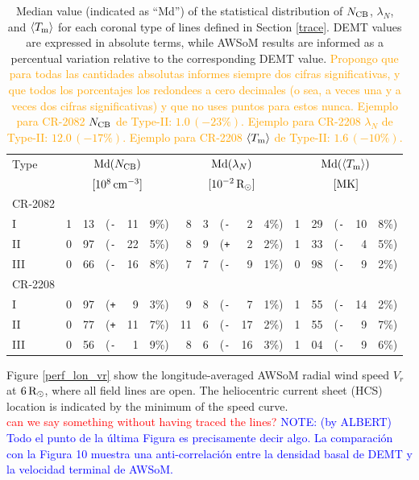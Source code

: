 \documentclass[namedreferences]{solarphysics}
\newcommand{\mrsun}{{\rm R_\odot}}
\newcommand{\med}{{\rm Md}}
\newcommand{\avgTe}{\left<\Tm\right>}
\newcommand{\MK}{{\rm MK}}
\newcommand{\lN}{\lambda_N}
\newcommand{\NCB}{N_{\rm CB}}
\newcommand{\Tm}{T_{\rm m}}
\newcommand{\aTm}{\left<\Tm\right>}
\newcommand{\Pl}{\texttt{+}}
\newcommand{\Mi}{\texttt{-}}
\def\diego#1{\textcolor{red}{#1}}
\def\albert#1{\textcolor{orange}{#1}}
\def\notebyalbert#1{\textcolor{blue}{NOTE: #1}}
\begin{document}
\begin{article}
\begin{table}
\begin{tabular}{l r@{.}l@{\hskip 0.05in} r@{\hskip 0.01in} r@{.}l  r@{.}l@{\hskip 0.05in} r@{\hskip 0.01in} r@{.}l r@{.}l@{\hskip 0.05in} r@{\hskip 0.01in} r@{.}l }
\hline
Type    & \multicolumn{5}{c}{$\med(\NCB)$}             & \multicolumn{5}{c}{$\med(\lN)$} & \multicolumn{5}{c}{$\med(\avgTe)$} \\
       & \multicolumn{5}{c}{$[10^8\,{\rm cm}^{-3}]$}  & \multicolumn{5}{c}{$[{\rm 10}^{-2}\,\mrsun]$} & \multicolumn{5}{c}{$[\MK]$} \\
\hline
CR-2082\\
I  & 1&13 &(\Mi&11&9\%)  &   8&3 &(\Mi&~2&4\%) &   1&29 &(\Mi&10&8\%) \\
II  & 0&97 &(\Mi&22&5\%)  &   8&9 &(\Pl&~2&2\%) &   1&33 &(\Mi&~4&5\%) \\
III  & 0&66 &(\Mi&16&8\%)  &   7&7 &(\Mi&~9&1\%) &   0&98 &(\Mi&~9&2\%) \\
\hline          
CR-2208\\
I  & 0&97 &(\Pl&~9&3\%)  &   9&8 &(\Mi&~7&1\%) &   1&55 &(\Mi&14&2\%) \\
II  & 0&77 &(\Pl&11&7\%)  &  11&6 &(\Mi&17&2\%) &   1&55 &(\Mi&~9&7\%) \\
III  & 0&56 &(\Mi&~1&9\%)  &   8&6 &(\Mi&16&3\%) &   1&04 &(\Mi&~9&6\%) \\
\end{tabular}
\caption{Median value (indicated as ``Md'') of the statistical distribution of $\NCB$, $\lN$, and $\aTm$ for each coronal type of lines defined in Section \ref{trace}. DEMT values are expressed in absolute terms, while AWSoM results are informed as a percentual variation relative to the corresponding DEMT value. \albert{Propongo que para todas las cantidades absolutas informes siempre dos cifras significativas, y que todos los porcentajes los redondees a cero decimales (o sea, a veces una y a veces dos cifras significativas) y que no uses puntos para estos nunca. Ejemplo para CR-2082 $\NCB$ de Type-II: $1.0\,(-23\%)$. Ejemplo para CR-2208 $\lambda_N$ de Type-II: $12.0\,(-17\%)$. Ejemplo para CR-2208 $\aTm$ de Type-II: $1.6\,(-10\%)$.}}
\label{tabla_comp}
\end{table}






Figure \ref{perf_lon_vr} show the longitude-averaged AWSoM radial wind speed $V_r$ at $6\,\mrsun$, where all field lines are open. The heliocentric current sheet (HCS) location is indicated by the minimum of the speed curve.\\
\diego{can we say something without having traced the lines?} \notebyalbert{(by ALBERT) Todo el punto de la última Figura es precisamente decir algo. La comparación con la Figura 10 muestra una anti-correlación entre la densidad basal de DEMT y la velocidad terminal de AWSoM.}


\end{article}
\end{document}
